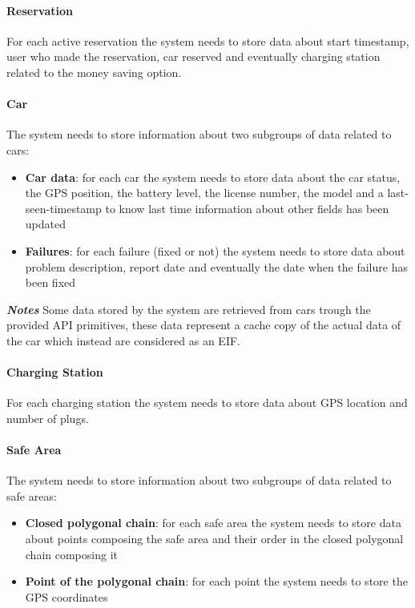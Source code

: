 \paragraph{Reservation} For each active reservation the system needs to store data about start timestamp, user who made the reservation, car reserved and eventually charging station related to the money saving option.

\paragraph{Car} The system needs to store information about two subgroups of data related to cars:
\begin{itemize}
	\item \textbf{Car data}: for each car the system needs to store data about the car status, the GPS position, the battery level, the license number, the model and a last-seen-timestamp to know last time information about other fields has been updated
	\item \textbf{Failures}: for each failure (fixed or not) the system needs to store data about problem description, report date and eventually the date when the failure has been fixed
\end{itemize}

\textbf{\emph{Notes}} Some data stored by the system are retrieved from cars trough the provided API primitives, these data represent a cache copy of the actual data of the car which instead are considered as an EIF. 

\paragraph{Charging Station} For each charging station the system needs to store data about GPS location and number of plugs.

\paragraph{Safe Area} The system needs to store information about two subgroups of data related to safe areas:
\begin{itemize}
	\item \textbf{Closed polygonal chain}: for each safe area the system needs to store data about points composing the safe area and their order in the closed polygonal chain composing it
	\item \textbf{Point of the polygonal chain}: for each point the system needs to store the GPS coordinates
\end{itemize}

